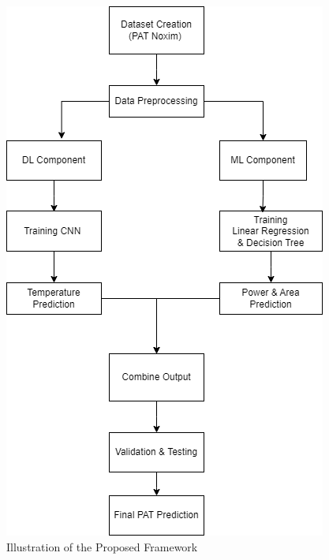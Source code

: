 \documentclass[conference]{IEEEtran}
\begin{document}
\begin{figure}[h]  %
    \centering
    \includegraphics[width=0.8\linewidth]{Proposed.png}  %
    \caption{Illustration of the Proposed Framework}  %
    \label{fig:proposed_framework}  %
\end{figure}
\end{document}
